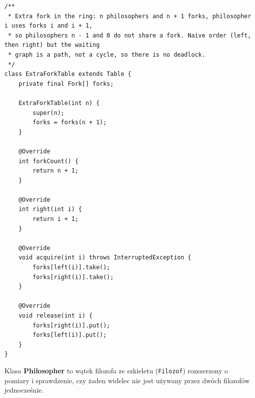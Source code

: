 \documentclass[11pt,a4paper]{article}
\begin{document}
\begin{lstlisting}[caption={Klasa \textbf{ExtraForkTable} (\texttt{src/ExtraForkTable.java})}]
/**
 * Extra fork in the ring: n philosophers and n + 1 forks, philosopher i uses forks i and i + 1,
 * so philosophers n - 1 and 0 do not share a fork. Naive order (left, then right) but the waiting
 * graph is a path, not a cycle, so there is no deadlock.
 */
class ExtraForkTable extends Table {
    private final Fork[] forks;

    ExtraForkTable(int n) {
        super(n);
        forks = forks(n + 1);
    }

    @Override
    int forkCount() {
        return n + 1;
    }

    @Override
    int right(int i) {
        return i + 1;
    }

    @Override
    void acquire(int i) throws InterruptedException {
        forks[left(i)].take();
        forks[right(i)].take();
    }

    @Override
    void release(int i) {
        forks[right(i)].put();
        forks[left(i)].put();
    }
}
\end{lstlisting}

Klasa \textbf{Philosopher} to wątek filozofa ze szkieletu (\texttt{Filozof}) rozszerzony o pomiary i sprawdzenie, czy żaden widelec nie jest używany przez dwóch filozofów jednocześnie.
\end{document}
